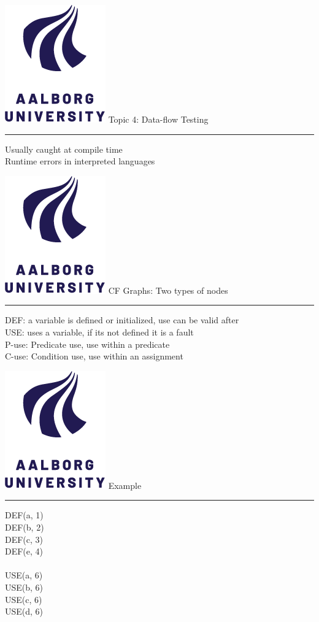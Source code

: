 \documentclass[aspectratio=1610,17pt,utf8]{beamer}
\newcommand{\mainframe}[1]{\color{blue} \includegraphics[width=.05\textwidth]{figures/aau.png} #1\\\hrule}
\newcommand{\mf}[1]{\mainframe{#1}}
\newcommand{\regularframe}[1]{\color{black}\includegraphics[width=.05\textwidth]{figures/aau.png} #1\\\hrule}
\newcommand{\rf}[1]{\regularframe{#1}}
\newcommand{\minip}[2]{\begin{minipage}{#1}#2\end{minipage}}
\begin{document}

\begin{frame}{\mf{Topic 4: Data-flow Testing}}
    Usually caught at compile time\\
    Runtime errors in interpreted languages
\end{frame}

\begin{frame}{\rf{CF Graphs: Two types of nodes}}
    DEF: a variable is defined or initialized, use can be valid after\\
    USE: uses a variable, if its not defined it is a fault\\
    P-use: Predicate use, use within a predicate\\
    C-use: Condition use, use within an assignment
\end{frame}

\begin{frame}{\rf{Example}}
    \begin{minipage}{.45\textwidth}
        DEF(a, 1)\\
        DEF(b, 2)\\
        DEF(c, 3)\\
        DEF(e, 4)\\
        \vspace{10pt}\\
        USE(a, 6)\\
        USE(b, 6)\\
        USE(c, 6)\\
        USE(d, 6)\\
    \end{minipage}
    \hspace{.05\textwidth}
    \minip{.45\textwidth}{}
\end{frame}
\end{document}
